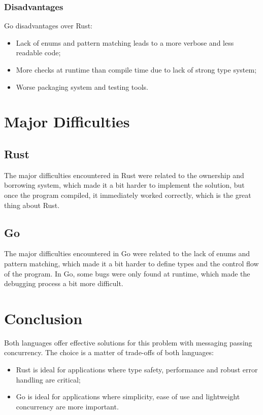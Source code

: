 \documentclass[a4paper]{article}
\begin{document}
\subsubsection{Disadvantages}

Go disadvantages over Rust:

\begin{itemize}
  \item Lack of enums and pattern matching leads to a more verbose and less readable code;
  \item More checks at runtime than compile time due to lack of strong type system;
  \item Worse packaging system and testing tools.
\end{itemize}

\section{Major Difficulties}

\subsection{Rust}

The major difficulties encountered in Rust were related to the ownership and borrowing system, which made it a bit harder to implement the solution, but once the program compiled, it immediately worked correctly, which is the great thing about Rust.

\subsection{Go}

The major difficulties encountered in Go were related to the lack of enums and pattern matching, which made it a bit harder to define types and the control flow of the program. In Go, some bugs were only found at runtime, which made the debugging process a bit more difficult.

\clearpage

\section{Conclusion}

Both languages offer effective solutions for this problem with messaging passing concurrency.
The choice is a matter of trade-offs of both languages:

\begin{itemize}
  \item Rust is ideal for applications where type safety, performance and robust error handling are critical;
  \item Go is ideal for applications where simplicity, ease of use and lightweight concurrency are more important.
\end{itemize}
\end{document}
